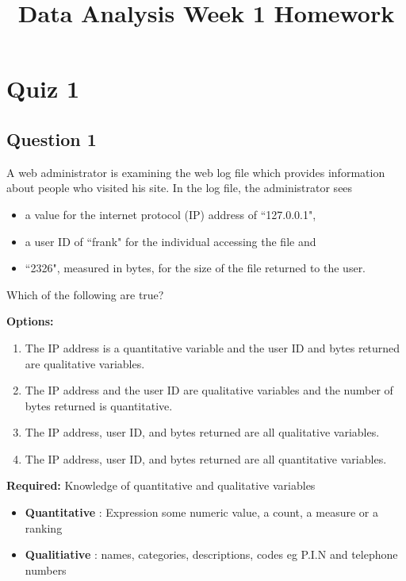 \documentclass[]{article}
\title{Data Analysis Week 1 Homework}
\author{}
\begin{document}
\maketitle



\section*{Quiz 1}

\subsection*{Question 1}
A web administrator is examining the web log file which provides information about people who visited his site. In the log file, the administrator sees 
\begin{itemize}
\item a value for the internet protocol (IP) address of ``127.0.0.1", \item a user ID of ``frank" for the individual accessing the file and \item ``2326", measured in bytes, for the size of the file returned to the user.
\end{itemize} Which of the following are true? 

\vspace{0.4cm}
\noindent \textbf{Options:}
\begin{enumerate}
\item The IP address is a quantitative variable and the user ID and bytes returned are qualitative variables.
\item The IP address and the user ID are qualitative variables and the number of bytes returned is quantitative.
\item The IP address, user ID, and bytes returned are all qualitative variables.
\item The IP address, user ID, and bytes returned are all quantitative variables.
\end{enumerate}

\vspace{0.2cm}
\noindent \textbf{Required:}  Knowledge of quantitative and qualitative variables

\begin{itemize}
\item \textbf{Quantitative}  : Expression some numeric value, a count, a measure or a ranking
\item \textbf{Qualitiative} : names, categories, descriptions, codes eg P.I.N and telephone numbers
\end{itemize}
\end{document}
